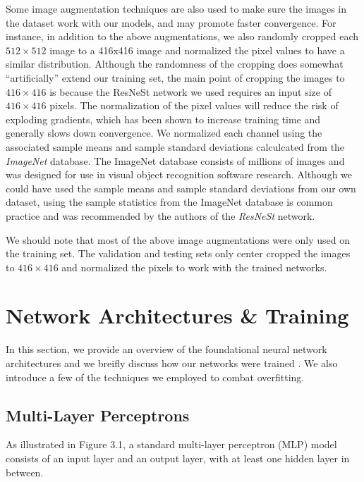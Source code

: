 \documentclass [MAS] {uclathes}
\begin{document}
Some image augmentation techniques are also used to make sure the images in the dataset work with our models, and may promote faster convergence. For instance, in addition to the above augmentations, we also randomly cropped each $512 \times 512$ image to a 416x416 image and normalized the pixel values to have a similar distribution. Although the randomness of the cropping does somewhat ``artificially'' extend our training set, the main point of cropping the images to $416 \times 416$ is because the ResNeSt network we used requires an input size of $416 \times 416$ pixels. The normalization of the pixel values will reduce the risk of exploding gradients, which has been shown to increase training time and generally slows down convergence. We normalized each channel using the associated sample means and sample standard deviations calculcated from the \textit{ImageNet} database. The ImageNet database consists of millions of images and was designed for use in visual object recognition software research. Although we could have used the sample means and sample standard deviations from our own dataset, using the sample statistics from the ImageNet database is common practice and was recommended by the authors of the \textit{ResNeSt} network.

We should note that most of the above image augmentations were only used on the training set. The validation and testing sets only center cropped the images to $416 \times 416$ and normalized the pixels to work with the trained networks.

\section{Network Architectures \& Training}

In this section, we provide an overview of the foundational neural network architectures and we breifly discuss how our networks were trained \cite{MLnote}. We also introduce a few of the techniques we employed to combat overfitting.

\subsection{Multi-Layer Perceptrons}

As illustrated in Figure 3.1, a standard multi-layer perceptron (MLP) model consists of an input layer and an output layer, with at least one hidden layer in between. 
\end{document}
